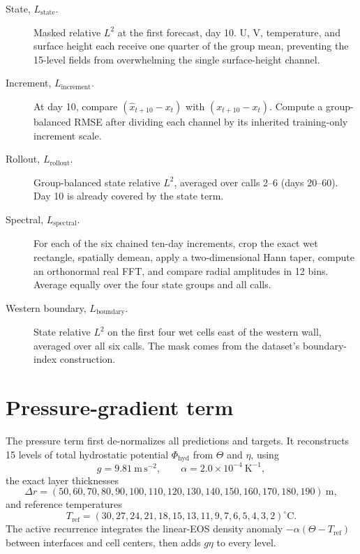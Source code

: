 \documentclass[11pt,oneside]{report}
\newcommand{\Ltwo}{L^2}
\begin{document}
\begin{description}
  \item[State, \(L_{\mathrm{state}}\).]
  Masked relative \(\Ltwo\) at the first forecast, day 10. U, V, temperature,
  and surface height each receive one quarter of the group mean, preventing the
  15-level fields from overwhelming the single surface-height channel.

  \item[Increment, \(L_{\mathrm{increment}}\).]
  At day 10, compare
  \((\widehat{x}_{t+10}-x_t)\) with
  \((x_{t+10}-x_t)\). Compute a group-balanced RMSE after dividing each channel
  by its inherited training-only increment scale.

  \item[Rollout, \(L_{\mathrm{rollout}}\).]
  Group-balanced state relative \(\Ltwo\), averaged over calls 2--6
  (days 20--60). Day 10 is already covered by the state term.

  \item[Spectral, \(L_{\mathrm{spectral}}\).]
  For each of the six chained ten-day increments, crop the exact wet rectangle,
  spatially demean, apply a two-dimensional Hann taper, compute an orthonormal
  real FFT, and compare radial amplitudes in 12 bins. Average equally over the
  four state groups and all calls.

  \item[Western boundary, \(L_{\mathrm{boundary}}\).]
  State relative \(\Ltwo\) on the first four wet cells east of the western wall,
  averaged over all six calls. The mask comes from the dataset's
  boundary-index construction.
\end{description}

\section{Pressure-gradient term}

The pressure term first de-normalizes all predictions and targets. It
reconstructs 15 levels of total hydrostatic potential
\(\Phi_{\mathrm{hyd}}\) from \(\Theta\) and \(\eta\), using
\[
  g=9.81\ \mathrm{m\,s^{-2}},
  \qquad
  \alpha=2.0\times10^{-4}\ \mathrm{K^{-1}},
\]
the exact layer thicknesses
\[
  \Delta r=(50,60,70,80,90,100,110,120,130,140,150,160,170,180,190)
  \ \mathrm{m},
\]
and reference temperatures
\[
  T_{\mathrm{ref}}=(30,27,24,21,18,15,13,11,9,7,6,5,4,3,2)^\circ\mathrm{C}.
\]
The active recurrence integrates the linear-EOS density anomaly
\(-\alpha(\Theta-T_{\mathrm{ref}})\) between interfaces and cell centers, then
adds \(g\eta\) to every level.
\end{document}
